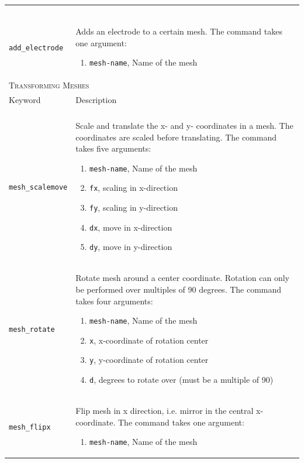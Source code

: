 \documentclass[noshowpacs,preprintnumbers,amsmath,amssymb, letter]{revtex4}
\begin{document}
\begin{longtable}{p{}p{}}
\begin{enumerate}
\end{enumerate}\\
\texttt{add\_electrode}	& Adds an electrode to a certain mesh. The command takes one argument:
\begin{enumerate}
\item \texttt{mesh-name}, Name of the mesh
\end{enumerate}\\
\multicolumn{2}{l}{\textsc{Transforming Meshes}} \\*
\hline
Keyword & Description \\
\hline\\
\texttt{mesh\_scalemove} 	& Scale and translate the x- and y- coordinates in a mesh. The coordinates are scaled before translating. The command takes five arguments:
\begin{enumerate}
\item \texttt{mesh-name}, Name of the mesh
\item \texttt{fx}, scaling in x-direction
\item \texttt{fy}, scaling in y-direction
\item \texttt{dx}, move in x-direction
\item \texttt{dy}, move in y-direction
\end{enumerate}\\
\texttt{mesh\_rotate} 	& Rotate mesh around a center coordinate. Rotation can only be performed over multiples of 90 degrees. The command takes four arguments:
\begin{enumerate}
\item \texttt{mesh-name}, Name of the mesh
\item \texttt{x}, x-coordinate of rotation center
\item \texttt{y}, y-coordinate of rotation center
\item \texttt{d}, degrees to rotate over (must be a multiple of 90)
\end{enumerate}\\
\texttt{mesh\_flipx} 	& Flip mesh in x direction, i.e. mirror in the central x-coordinate. The command takes one argument:
\begin{enumerate}
\item \texttt{mesh-name}, Name of the mesh

\end{enumerate}
\end{longtable}
\end{document}
